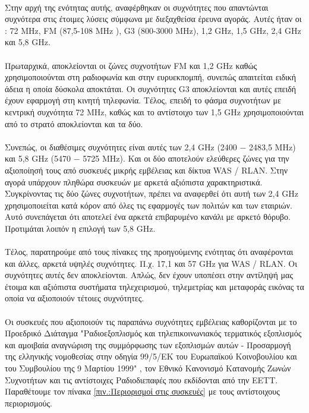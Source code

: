 \documentclass[a4paper, 12pt, twoside]{report}
\begin{document}
{{{{{{			\paragraph{}{Στην αρχή της ενότητας αυτής, αναφέρθηκαν οι συχνότητες που απαντώνται συχνότερα στις έτοιμες λύσεις σύμφωνα με διεξαχθείσα έρευνα αγοράς. Αυτές ήταν οι : 72 MHz, FM (87,5-108 MHz ), G3 (800-3000 MHz), 1,2 GHz, 1,5 GHz, 2,4 GHz και 5,8 GHz.
			}
			\paragraph{}{Πρωταρχικά, αποκλείονται οι ζώνες συχνοτήτων FM και 1,2 GHz καθώς χρησιμοποιούνται στη ραδιοφωνία και στην ευρυεκπομπή, συνεπώς απαιτείται ειδική άδεια η οποία δύσκολα αποκτάται. Οι συχνότητες G3 αποκλείονται και αυτές επειδή έχουν εφαρμογή στη κινητή τηλεφωνία. Τέλος, επειδή το φάσμα συχνοτήτων με κεντρική συχνότητα 72 MHz, καθώς και το αντίστοιχο των 1,5 GHz χρησιμοποιούνται από το στρατό αποκλείονται και τα δύο.
			}
			\paragraph{}{Συνεπώς, οι διαθέσιμες συχνότητες είναι αυτές των 2,4 GHz (2400 − 2483,5 MHz) και 5,8 GHz (5470 − 5725 ΜΗz). Και οι δύο αποτελούν ελεύθερες ζώνες για την αξιοποίησή τους από συσκευές μικρής εμβέλειας και δίκτυα WAS / RLAN. Στην αγορά υπάρχουν πληθώρα συσκευών με αρκετά αξιόπιστα χαρακτηριστικά. Συγκρίνοντας τις δύο ζώνες συχνοτήτων, πρέπει να αναφερθεί ότι αυτή των 2,4 GHz χρησιμοποιείται κατά κόρον από όλες τις εφαρμογές των πολιτών και των εταιριών. Αυτό συνεπάγεται ότι αποτελεί ένα αρκετά επιβαρυμένο κανάλι με αρκετό θόρυβο. Προτιμάται λοιπόν η επιλογή των 5,8 GHz.
			}
			\paragraph{}{Τέλος, παρατηρούμε από τους πίνακες της προηγούμενης ενότητας ότι αναφέρονται και άλλες, αρκετά υψηλές συχνότητες. Π.χ. 17,1 και 57 GHz για WAS / RLAN. Οι συχνότητες αυτές δεν αποκλείονται. Απλώς, δεν έχουν υποπέσει στην αντίληψή μας έτοιμα και αξιόπιστα συστήματα τηλεχειρισμού, τηλεμετρίας και μεταφοράς εικόνας τα οποία να αξιοποιούν τέτοιες συχνότητες.
			}
			}
			\paragraph{}{Οι συσκευές που αξιοποιούν τις παραπάνω συχνότητες  εμβέλειας καθορίζονται με το Προεδρικό Διάταγμα "Ραδιοεξοπλισμός και τηλεπικοινωνιακός τερματικός εξοπλισμός και αμοιβαία αναγνώριση της συμμόρφωσης των εξοπλισμών αυτών - Προσαρμογή της ελληνικής νομοθεσίας στην οδηγία 99/5/ΕΚ του Ευρωπαϊκού Κοινοβουλίου και του Συμβουλίου της 9 Μαρτίου 1999" \cite{ΦΕΚ202Α44}, τον Εθνικό Κανονισμό Κατανομής Ζωνών Συχνοτήτων \cite{ΦΕΚ2006Β399} και τις αντίστοιχες Ραδιοδιεπαφές που εκδίδονται από την ΕΕΤΤ. Παραθέτουμε τον πίνακα \ref{πιν.:Περιορισμοί στις συσκευές} με τους αντίστοιχους περιορισμούς.
			}
			
}}}}}
\end{document}
